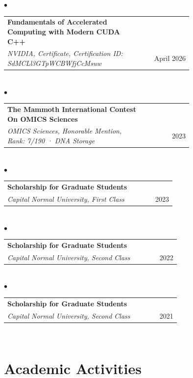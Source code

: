 \documentclass[11pt, a4paper]{article}
\begin{document}
\hspace{1em}$\bullet$\quad\begin{tabular}{@{}p{0.75\linewidth}r@{}}\textbf{Fundamentals of Accelerated Computing with Modern CUDA C++}\\
\textit{NVIDIA, Certificate, Certification ID: SdMCLl3GTpWCBWfjCcMsuw} & April 2026\\\end{tabular}\\

\hspace{1em}$\bullet$\quad\begin{tabular}{@{}p{0.75\linewidth}r@{}}\textbf{The Mammoth International Contest On OMICS Sciences}\\
\textit{OMICS Sciences, Honorable Mention, Rank: 7/190 · DNA Storage} & 2023\\\end{tabular}\\

\hspace{1em}$\bullet$\quad\begin{tabular}{@{}p{0.75\linewidth}r@{}}\textbf{Scholarship for Graduate Students}\\
\textit{Capital Normal University, First Class} & 2023\\\end{tabular}\\

\hspace{1em}$\bullet$\quad\begin{tabular}{@{}p{0.75\linewidth}r@{}}\textbf{Scholarship for Graduate Students}\\
\textit{Capital Normal University, Second Class} & 2022\\\end{tabular}\\

\hspace{1em}$\bullet$\quad\begin{tabular}{@{}p{0.75\linewidth}r@{}}\textbf{Scholarship for Graduate Students}\\
\textit{Capital Normal University, Second Class} & 2021\\\end{tabular}\\

\section{Academic Activities}
\end{document}
